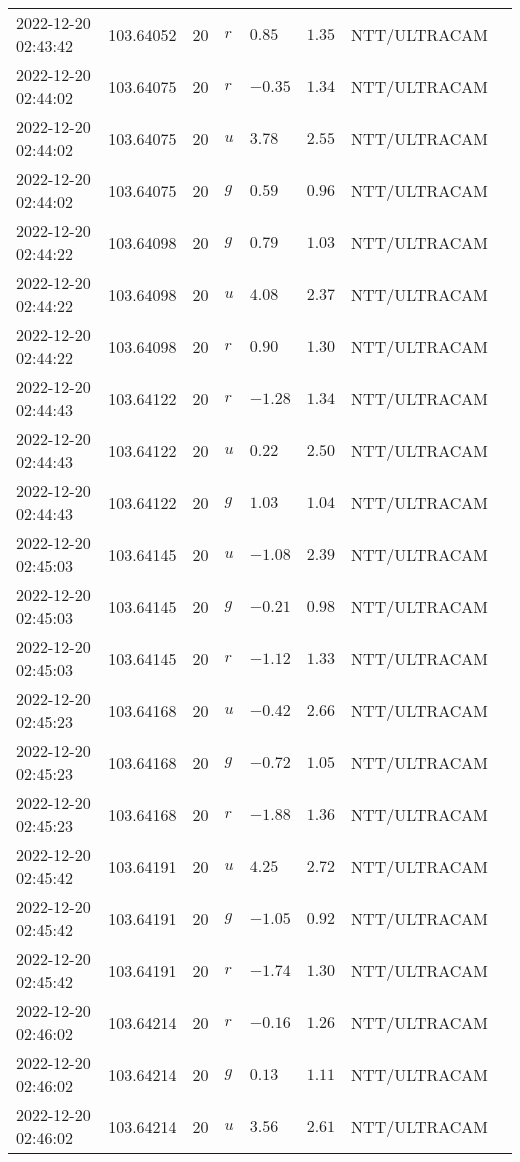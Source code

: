 \documentclass{nature_plusfigure}
\begin{document}
\begin{supplement}
\begin{center}
\begin{longtable}{llllllll}
2022-12-20 02:43:42 & 103.64052 & 20 & $r$ & $0.85$ & $1.35$ & NTT/ULTRACAM &  \\ 
2022-12-20 02:44:02 & 103.64075 & 20 & $r$ & $-0.35$ & $1.34$ & NTT/ULTRACAM &  \\ 
2022-12-20 02:44:02 & 103.64075 & 20 & $u$ & $3.78$ & $2.55$ & NTT/ULTRACAM &  \\ 
2022-12-20 02:44:02 & 103.64075 & 20 & $g$ & $0.59$ & $0.96$ & NTT/ULTRACAM &  \\ 
2022-12-20 02:44:22 & 103.64098 & 20 & $g$ & $0.79$ & $1.03$ & NTT/ULTRACAM &  \\ 
2022-12-20 02:44:22 & 103.64098 & 20 & $u$ & $4.08$ & $2.37$ & NTT/ULTRACAM &  \\ 
2022-12-20 02:44:22 & 103.64098 & 20 & $r$ & $0.90$ & $1.30$ & NTT/ULTRACAM &  \\ 
2022-12-20 02:44:43 & 103.64122 & 20 & $r$ & $-1.28$ & $1.34$ & NTT/ULTRACAM &  \\ 
2022-12-20 02:44:43 & 103.64122 & 20 & $u$ & $0.22$ & $2.50$ & NTT/ULTRACAM &  \\ 
2022-12-20 02:44:43 & 103.64122 & 20 & $g$ & $1.03$ & $1.04$ & NTT/ULTRACAM &  \\ 
2022-12-20 02:45:03 & 103.64145 & 20 & $u$ & $-1.08$ & $2.39$ & NTT/ULTRACAM &  \\ 
2022-12-20 02:45:03 & 103.64145 & 20 & $g$ & $-0.21$ & $0.98$ & NTT/ULTRACAM &  \\ 
2022-12-20 02:45:03 & 103.64145 & 20 & $r$ & $-1.12$ & $1.33$ & NTT/ULTRACAM &  \\ 
2022-12-20 02:45:23 & 103.64168 & 20 & $u$ & $-0.42$ & $2.66$ & NTT/ULTRACAM &  \\ 
2022-12-20 02:45:23 & 103.64168 & 20 & $g$ & $-0.72$ & $1.05$ & NTT/ULTRACAM &  \\ 
2022-12-20 02:45:23 & 103.64168 & 20 & $r$ & $-1.88$ & $1.36$ & NTT/ULTRACAM &  \\ 
2022-12-20 02:45:42 & 103.64191 & 20 & $u$ & $4.25$ & $2.72$ & NTT/ULTRACAM &  \\ 
2022-12-20 02:45:42 & 103.64191 & 20 & $g$ & $-1.05$ & $0.92$ & NTT/ULTRACAM &  \\ 
2022-12-20 02:45:42 & 103.64191 & 20 & $r$ & $-1.74$ & $1.30$ & NTT/ULTRACAM &  \\ 
2022-12-20 02:46:02 & 103.64214 & 20 & $r$ & $-0.16$ & $1.26$ & NTT/ULTRACAM &  \\ 
2022-12-20 02:46:02 & 103.64214 & 20 & $g$ & $0.13$ & $1.11$ & NTT/ULTRACAM &  \\ 
2022-12-20 02:46:02 & 103.64214 & 20 & $u$ & $3.56$ & $2.61$ & NTT/ULTRACAM &  \\ 

\end{longtable}
\end{center}
\end{supplement}
\end{document}
